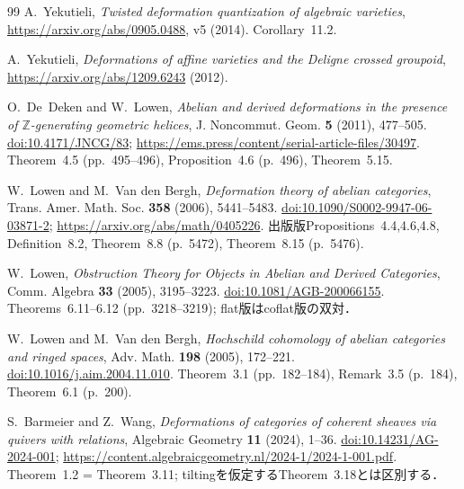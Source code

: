 \documentclass[11pt,a4paper]{ltjsarticle}
\numberwithin{equation}{section}
\begin{document}
\begin{thebibliography}{99}
A.~Yekutieli,
\emph{Twisted deformation quantization of algebraic varieties},
\url{https://arxiv.org/abs/0905.0488}, v5 (2014).
Corollary~11.2.

A.~Yekutieli,
\emph{Deformations of affine varieties and the Deligne crossed groupoid},
\url{https://arxiv.org/abs/1209.6243} (2012).

O.~De~Deken and W.~Lowen,
\emph{Abelian and derived deformations in the presence of
$\mathbb Z$-generating geometric helices},
J. Noncommut. Geom. \textbf{5} (2011), 477--505.
\href{https://doi.org/10.4171/JNCG/83}{doi:10.4171/JNCG/83};
\url{https://ems.press/content/serial-article-files/30497}.
Theorem~4.5 (pp.~495--496), Proposition~4.6 (p.~496), Theorem~5.15.

W.~Lowen and M.~Van den Bergh,
\emph{Deformation theory of abelian categories},
Trans. Amer. Math. Soc. \textbf{358} (2006), 5441--5483.
\href{https://doi.org/10.1090/S0002-9947-06-03871-2}{doi:10.1090/S0002-9947-06-03871-2};
\url{https://arxiv.org/abs/math/0405226}.
出版版Propositions~4.4,4.6,4.8, Definition~8.2,
Theorem~8.8 (p.~5472), Theorem~8.15 (p.~5476).

W.~Lowen,
\emph{Obstruction Theory for Objects in Abelian and Derived Categories},
Comm. Algebra \textbf{33} (2005), 3195--3223.
\href{https://doi.org/10.1081/AGB-200066155}{doi:10.1081/AGB-200066155}.
Theorems~6.11--6.12 (pp.~3218--3219); flat版はcoflat版の双対．

W.~Lowen and M.~Van den Bergh,
\emph{Hochschild cohomology of abelian categories and ringed spaces},
Adv. Math. \textbf{198} (2005), 172--221.
\href{https://doi.org/10.1016/j.aim.2004.11.010}{doi:10.1016/j.aim.2004.11.010}.
Theorem~3.1 (pp.~182--184), Remark~3.5 (p.~184), Theorem~6.1 (p.~200).

S.~Barmeier and Z.~Wang,
\emph{Deformations of categories of coherent sheaves via quivers with relations},
Algebraic Geometry \textbf{11} (2024), 1--36.
\href{https://doi.org/10.14231/AG-2024-001}{doi:10.14231/AG-2024-001};
\url{https://content.algebraicgeometry.nl/2024-1/2024-1-001.pdf}.
Theorem~1.2 = Theorem~3.11; tiltingを仮定するTheorem~3.18とは区別する．


\end{thebibliography}
\end{document}
